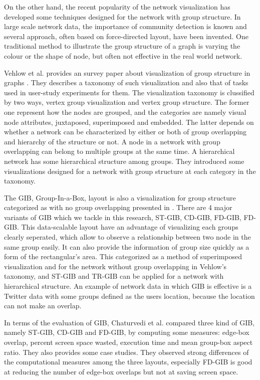 \documentclass{vgtc}                          %
\begin{document}
On the other hand, the recent popularity of the network visualization has developed some techniques designed for the network with group structure. In large scale network data, the importance of community detection is known and several approach, often based on force-directed layout, have been invented. One traditional method to illustrate the group structure of a graph is varying the colour \cite{mcpherson2005discovering} or the shape of node, but often not effective in the real world network.

Vehlow et al. provides an survey paper about visualization of group structure in graphs \cite{Vehlow2017VisualizingGS}.
They describes a taxonomy of such visualization and also that of tasks used in user-study experiments for them.
The visualization taxonomy is clussified by two ways, vertex group visualization and vertex group structure.
The former one represent how the nodes are grouped, and the categories are namely visual node attributes, juxtaposed, superimposed and embedded.
The latter depends on whether a network can be characterized by either or both of group overlapping and hierarchy of the structure or not.
A node in a network with group overlapping can belong to multiple groups at the same time.
A hierarchical network has some hierarchical structure among groups.
They introduced some visualizations designed for a network with group structure at each category in the taxonomy.

The GIB, Group-In-a-Box, layout is also a visualization for group structure categorized as with no group overlapping presented in \cite{rodrigues2011group,chaturvedi2014group,onoue2017optimal}. There are 4 major variants of GIB which we tackle in this research, ST-GIB, CD-GIB, FD-GIB, FD-GIB. This data-scalable layout have an advantage of visualizing each groups clearly seperated, which allow to observe a relationship between two node in the same group easily. It can also provide the information of group size quickly as a form of the rectangular's area.
This categorized as a method of superimposed visualization and for the network without group overlapping in Vehlow's taxonomy, and ST-GIB and TR-GIB can be applied for a network with hierarchical structure.
An example of network data in which GIB is effective is a Twitter data with some groups defined as the users location, because the location can not make an overlap.

In terms of the evaluation of GIB, Chaturvedi et al. \cite{chaturvedi2014group} compared three kind of GIB, namely ST-GIB, CD-GIB and FD-GIB, by computing some measures: edge-box overlap, percent screen space wasted, execution time and mean group-box aspect ratio.
They also provides some case studies.
They observed strong differences of the computational measures among the three layouts, especially FD-GIB is good at reducing the number of edge-box overlaps but not at saving screen space.
\end{document}

